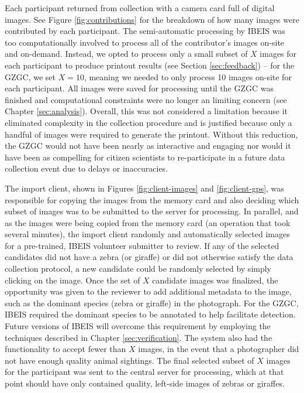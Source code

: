 Each participant returned from collection with a camera card full of digital images.  See Figure \ref{fig:contributions} for the breakdown of how many images were contributed by each participant.  The semi-automatic processing by IBEIS was too computationally involved to process all of the contributor's images on-site and on-demand.  Instead, we opted to process only a small subset of $X$ images for each participant to produce printout results (see Section \ref{sec:feedback}) -- for the GZGC, we set $X=10$, meaning we needed to only process 10 images on-site for each participant.  All images were saved for processing until the GZGC was finished and computational constraints were no longer an limiting concern (see Chapter \ref{sec:analysis}).  Overall, this was not considered a limitation because it eliminated complexity in the collection procedure and is justified because only a handful of images were required to generate the printout.  Without this reduction, the GZGC would not have been nearly as interactive and engaging nor would it have been as compelling for citizen scientists to re-participate in a future data collection event due to delays or inaccuracies.

The import client, shown in Figures \ref{fig:client-images} and \ref{fig:client-gps}, was responsible for copying the images from the memory card and also deciding which subset of images was to be submitted to the server for processing.  In parallel, and as the images were being copied from the memory card (an operation that took several minutes), the import client randomly and automatically selected images for a pre-trained, IBEIS volunteer submitter to review.  If any of the selected candidates did not have a zebra (or giraffe) or did not otherwise satisfy the data collection protocol, a new candidate could be randomly selected by simply clicking on the image.  Once the set of $X$ candidate images was finalized, the opportunity was given to the reviewer to add additional metadata to the image, such as the dominant species (zebra or giraffe) in the photograph.  For the GZGC, IBEIS required the dominant species to be annotated to help facilitate detection.  Future versions of IBEIS will overcome this requirement by employing the techniques described in Chapter \ref{sec:verification}.  The system also had the functionality to accept fewer than $X$ images, in the event that a photographer did not have enough quality animal sightings.  The final selected subset of $X$ images for the participant was sent to the central server for processing, which at that point should have only contained quality, left-side images of zebras or giraffes.  %

